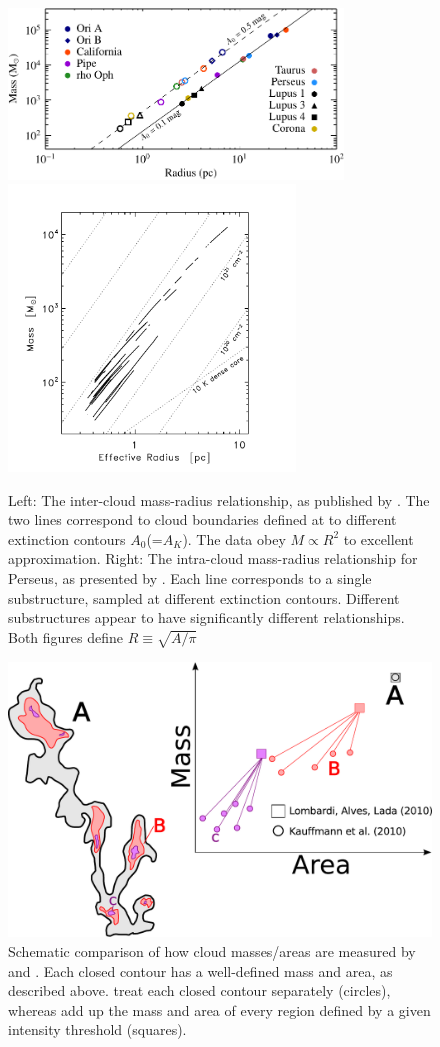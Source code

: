 \begin{figure}
\includegraphics[width=3.5in]{lombardi}
\includegraphics[width=3in]{kauffmann}
\caption{Left: The inter-cloud mass-radius relationship, as published by \cite{Lombardi10}. The two lines correspond to cloud boundaries defined at to different extinction contours $A_0$(=$A_K$). The data obey $M \propto R^2$ to excellent approximation. Right: The intra-cloud mass-radius relationship for Perseus, as presented by \cite{Kauffmann10a}. Each line corresponds to a single substructure, sampled at different extinction contours. Different substructures appear to have significantly different relationships. Both figures define $R \equiv \sqrt{A / \pi}$}
\label{fig:compare}
\end{figure}

\begin{figure}
\includegraphics[width=5in]{clouds_1}
\caption{Schematic comparison of how cloud masses/areas are measured by \cite{Lombardi10} and \cite{Kauffmann10a}. Each closed contour has a well-defined mass and area, as described above. \cite{Kauffmann10a} treat each closed contour separately (circles), whereas \cite{Lombardi10} add up the mass and area of every region defined by a given intensity threshold (squares). }
\label{fig:schematic_1}
\end{figure}

